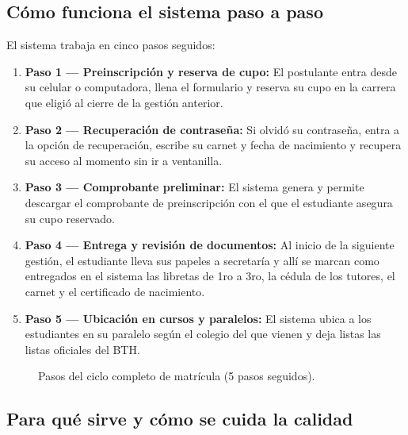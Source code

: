 \subsection{Cómo funciona el sistema paso a paso}

El sistema trabaja en cinco pasos seguidos:

\begin{enumerate}
    \item \textbf{Paso 1 — Preinscripción y reserva de cupo:} El postulante entra desde su celular o computadora, llena el formulario y reserva su cupo en la carrera que eligió al cierre de la gestión anterior.
    \item \textbf{Paso 2 — Recuperación de contraseña:} Si olvidó su contraseña, entra a la opción de recuperación, escribe su carnet y fecha de nacimiento y recupera su acceso al momento sin ir a ventanilla.
    \item \textbf{Paso 3 — Comprobante preliminar:} El sistema genera y permite descargar el comprobante de preinscripción con el que el estudiante asegura su cupo reservado.
    \item \textbf{Paso 4 — Entrega y revisión de documentos:} Al inicio de la siguiente gestión, el estudiante lleva sus papeles a secretaría y allí se marcan como entregados en el sistema las libretas de 1ro a 3ro, la cédula de los tutores, el carnet y el certificado de nacimiento.
    \item \textbf{Paso 5 — Ubicación en cursos y paralelos:} El sistema ubica a los estudiantes en su paralelo según el colegio del que vienen y deja listas las listas oficiales del BTH.
\end{enumerate}

\begin{figure}[htbp]
    \centering
    \caption{Pasos del ciclo completo de matrícula (5 pasos seguidos).}
    \label{fig:flujo_matricula}
    \resizebox{0.88\textwidth}{!}{%
        
    }
\end{figure}

\subsection{Para qué sirve y cómo se cuida la calidad}

